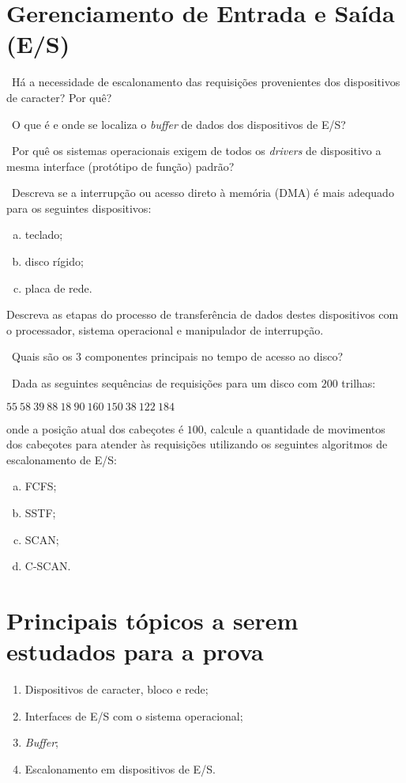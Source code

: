 
\section*{Gerenciamento de Entrada e Saída (E/S)}


\exercise~Há a necessidade de escalonamento das requisições provenientes
    dos dispositivos de caracter? Por quê?

\exercise~O que é e onde se localiza o {\em buffer} de dados dos
    dispositivos de E/S?

\exercise~Por quê os sistemas operacionais exigem de todos os {\em
      drivers} de dispositivo a mesma interface (protótipo de função)
    padrão?

    \exercise~Descreva se a interrupção ou acesso direto à memória
    (DMA) é mais adequado para os seguintes dispositivos:
\begin{enumerate}[a)]
\item teclado;
\item disco rígido;
\item placa de rede.
\end{enumerate}

\noindent Descreva as etapas do processo de transferência de dados
destes dispositivos com o processador, sistema operacional e
manipulador de interrupção.

\exercise~Quais são os $3$ componentes principais no tempo de acesso ao
    disco?

\exercise~Dada as seguintes sequências de requisições para um disco
    com $200$ trilhas:
    \begin{center}
      $55\ 58\ 39\ 88\ 18\ 90\ 160\ 150\ 38\ 122\ 184$
    \end{center}
    onde a posição atual dos cabeçotes é $100$, calcule a quantidade
    de movimentos dos cabeçotes para atender às requisições utilizando
    os seguintes algoritmos de escalonamento de E/S:
    
    \begin{enumerate}[a)]
    \item FCFS;
    \item SSTF;
    \item SCAN;
    \item C-SCAN.
    \end{enumerate}
 
\section*{Principais t\'opicos a serem estudados para a prova}

\begin{enumerate}
\item Dispositivos de caracter, bloco e rede;
\item Interfaces de E/S com o sistema operacional;
\item {\em Buffer};
\item Escalonamento em dispositivos de E/S.
\end{enumerate}

